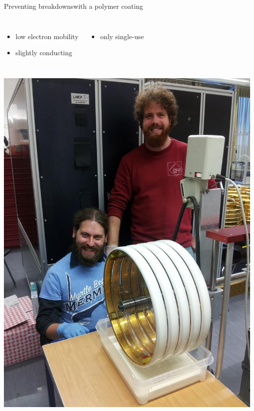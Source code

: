 \documentclass[]{beamer}
\newcommand*{\emphcol}{blue}
\begin{document}
\begin{frame}{Preventing breakdowns}{with a polymer coating}
	\begin{columns}[c]
		\begin{itemize}
			\item low electron mobility
			\item slightly conducting
		\end{itemize}
		\begin{itemize}
			\item {\color{\emphcol} only single-use}
		\end{itemize}
	\end{columns}
	\begin{columns}[c]
		\centering
		\includegraphics[width=\textwidth]{defence/coating}
		\centering

\end{columns}
\end{frame}
\end{document}
